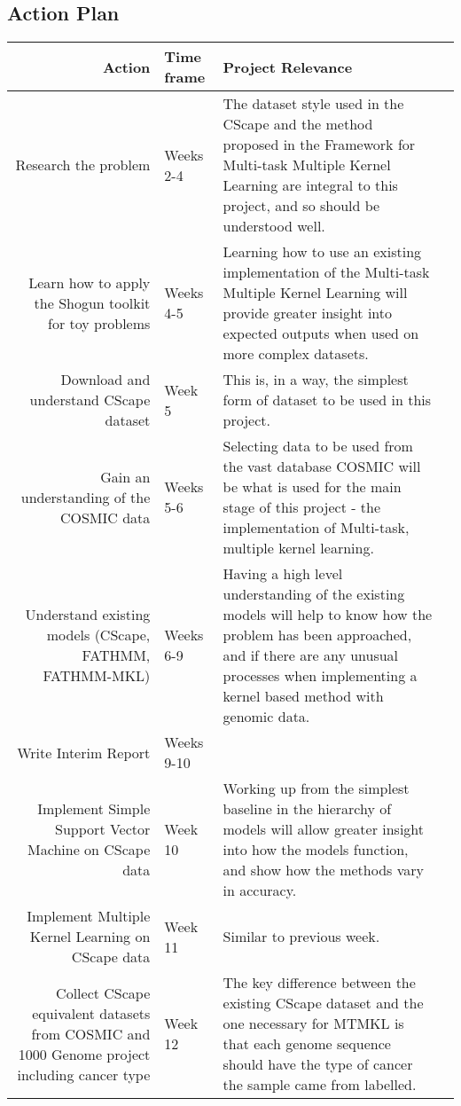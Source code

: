 \documentclass[11pt]{article}
\begin{document}
\subsection{Action Plan}
\begin{longtable}{|Rp{\tabcolsep\relax}|p{\tabcolsep\relax}|p{\tabcolsep\relax}|}
	\hline
	Action & Time frame & Project Relevance \\ \hline\hline
	Research the problem & Weeks 2-4 & The dataset style used in  the CScape \cite{Rogers2017} and the method proposed in the Framework for Multi-task Multiple Kernel Learning \cite{Widmer2015} are integral to this project, and so should be understood well. \\ \hline
 	Learn how to apply the Shogun toolkit for toy problems  & Weeks 4-5 & Learning how to use an existing implementation of the Multi-task Multiple Kernel Learning will provide greater insight into expected outputs when used on more complex datasets. \\\hline
	Download and understand CScape dataset & Week 5 & This is, in a way, the simplest form of dataset to be used in this project. \\ \hline
 	Gain an understanding of the COSMIC \cite{Forbes2017} data & Weeks 5-6 & Selecting data to be used from the vast database COSMIC will be what is used for the main stage of this project - the implementation of Multi-task, multiple kernel learning. \\ \hline
 	Understand existing models (CScape, FATHMM, FATHMM-MKL) & Weeks 6-9 &  Having a high level understanding of the existing models will help to know how the problem has been approached, and if there are any unusual processes when implementing a kernel based method with genomic data.\\ \hline
 	Write Interim Report & Weeks 9-10 &   \\ \hline
	Implement Simple Support Vector Machine on CScape data & Week 10 & Working up from the simplest baseline in the hierarchy of models will allow greater insight into how the models function, and show how the methods vary in accuracy. \\ \hline
	Implement Multiple Kernel Learning on CScape data & Week 11 & Similar to previous week.  \\ \hline
	Collect CScape equivalent datasets from COSMIC and 1000 Genome project including cancer type & Week 12 & The key difference between the existing CScape dataset and the one necessary for MTMKL is that each genome sequence should have the type of cancer the sample came from labelled. \\ \hline

\end{longtable}
\end{document}
